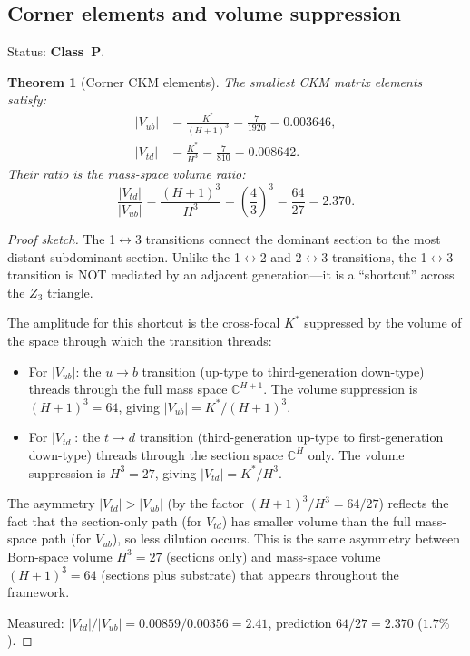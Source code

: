 \documentclass[11pt,a4paper]{article}
\newtheorem{theorem}{Theorem}[section]
\theoremstyle{definition}
\theoremstyle{remark}
\newcommand{\C}{\mathbb{C}}
\begin{document}
\subsection{Corner elements and volume suppression}\label{sec:corners}

Status: \textbf{Class~P}.

\begin{theorem}[Corner CKM elements]\label{thm:corners}
The smallest CKM matrix elements satisfy:
\begin{align}
|V_{ub}| &= \frac{K^*}{(H+1)^3} = \frac{7}{1920} = 0.003646, \label{eq:Vub}\\
|V_{td}| &= \frac{K^*}{H^3} = \frac{7}{810} = 0.008642. \label{eq:Vtd}
\end{align}
Their ratio is the mass-space volume ratio:
\begin{equation}\label{eq:corner_ratio}
\frac{|V_{td}|}{|V_{ub}|} = \frac{(H+1)^3}{H^3} = \left(\frac{4}{3}\right)^3 = \frac{64}{27} = 2.370.
\end{equation}
\end{theorem}

\begin{proof}[Proof sketch]
The 1$\leftrightarrow$3 transitions connect the dominant section to the most distant subdominant section. Unlike the 1$\leftrightarrow$2 and 2$\leftrightarrow$3 transitions, the 1$\leftrightarrow$3 transition is NOT mediated by an adjacent generation---it is a ``shortcut'' across the $Z_3$ triangle.

The amplitude for this shortcut is the cross-focal $K^*$ suppressed by the volume of the space through which the transition threads:
\begin{itemize}[nosep]
\item For $|V_{ub}|$: the $u \to b$ transition (up-type to third-generation down-type) threads through the full mass space $\C^{H+1}$. The volume suppression is $(H+1)^3 = 64$, giving $|V_{ub}| = K^*/(H+1)^3$.
\item For $|V_{td}|$: the $t \to d$ transition (third-generation up-type to first-generation down-type) threads through the section space $\C^H$ only. The volume suppression is $H^3 = 27$, giving $|V_{td}| = K^*/H^3$.
\end{itemize}

The asymmetry $|V_{td}| > |V_{ub}|$ (by the factor $(H+1)^3/H^3 = 64/27$) reflects the fact that the section-only path (for $V_{td}$) has smaller volume than the full mass-space path (for $V_{ub}$), so less dilution occurs. This is the same asymmetry between Born-space volume $H^3 = 27$ (sections only) and mass-space volume $(H+1)^3 = 64$ (sections plus substrate) that appears throughout the framework.

Measured: $|V_{td}|/|V_{ub}| = 0.00859/0.00356 = 2.41$, prediction $64/27 = 2.370$ ($1.7\%$).
\end{proof}
\end{document}
